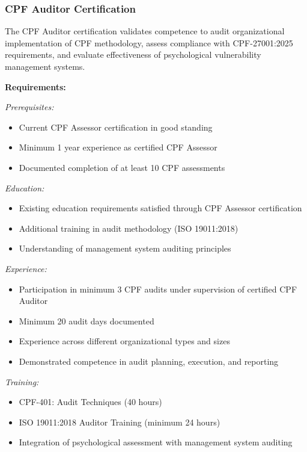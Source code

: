\documentclass[11pt,a4paper]{article}
\begin{document}
\subsubsection{CPF Auditor Certification}

The CPF Auditor certification validates competence to audit organizational implementation of CPF methodology, assess compliance with CPF-27001:2025 requirements, and evaluate effectiveness of psychological vulnerability management systems.

\textbf{Requirements:}

\textit{Prerequisites:}
\begin{itemize}
\item Current CPF Assessor certification in good standing
\item Minimum 1 year experience as certified CPF Assessor
\item Documented completion of at least 10 CPF assessments
\end{itemize}

\textit{Education:}
\begin{itemize}
\item Existing education requirements satisfied through CPF Assessor certification
\item Additional training in audit methodology (ISO 19011:2018)
\item Understanding of management system auditing principles
\end{itemize}

\textit{Experience:}
\begin{itemize}
\item Participation in minimum 3 CPF audits under supervision of certified CPF Auditor
\item Minimum 20 audit days documented
\item Experience across different organizational types and sizes
\item Demonstrated competence in audit planning, execution, and reporting
\end{itemize}

\textit{Training:}
\begin{itemize}
\item CPF-401: Audit Techniques (40 hours)
\item ISO 19011:2018 Auditor Training (minimum 24 hours)
\item Integration of psychological assessment with management system auditing
\end{itemize}
\end{document}
